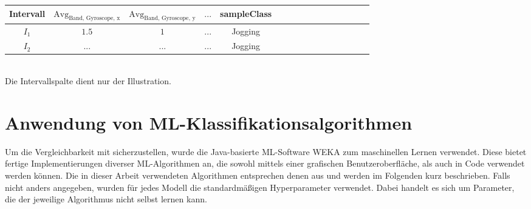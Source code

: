 \begin{tabular}{|c|c|c|c|c|c|c|c|c|c|c|c|c|c|c|c|}
	\hline 
	Intervall & $\text{Avg}_\text{Band, Gyroscope, x}$ & $\text{Avg}_\text{Band, Gyroscope, y}$  & $...$  & sampleClass  \\ 
	\hline 
	$I_1$ & $1.5$ & $1$ & $...$ & Jogging \\ 
	\hline 
	$I_2$ & $...$ & $...$ & $...$ & Jogging   \\ 
	\hline 
\end{tabular} \\

Die Intervallspalte dient nur der Illustration.

\section{Anwendung von ML-Klassifikationsalgorithmen}
Um die Vergleichbarkeit mit \cite{Weiss2016} sicherzustellen, wurde die Java-basierte ML-Software WEKA zum maschinellen Lernen verwendet. Diese bietet fertige Implementierungen diverser ML-Algorithmen an, die sowohl mittels einer grafischen Benutzeroberfläche, als auch in Code verwendet werden können. Die in dieser Arbeit verwendeten Algorithmen entsprechen denen aus \cite{Weiss2016} und werden im Folgenden kurz beschrieben. Falls nicht anders angegeben, wurden für jedes Modell die standardmäßigen Hyperparameter verwendet. Dabei handelt es sich um Parameter, die der jeweilige Algorithmus nicht selbst lernen kann.
